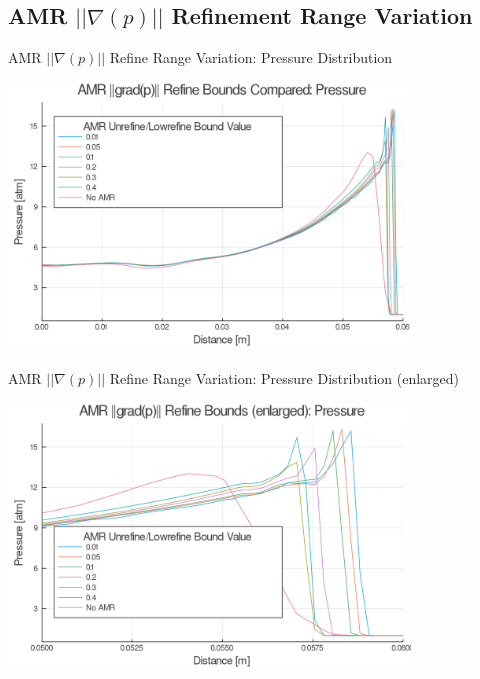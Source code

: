 \subsection{AMR $|| \nabla (p)||$ Refinement Range Variation}

\begin{frame}{AMR $|| \nabla (p)||$ Refine Range Variation: Pressure Distribution}
\begin{center}
\includegraphics[width=0.8\textwidth]{../figs/amrfigs/amr_refinebounds/p.png}
\end{center}
\end{frame}

\begin{frame}{AMR $|| \nabla (p)||$ Refine Range Variation: Pressure Distribution (enlarged)}
\begin{center}
\includegraphics[width=0.8\textwidth]{../figs/amrfigs/amr_refinebounds/pe.png}
\end{center}
\end{frame}

